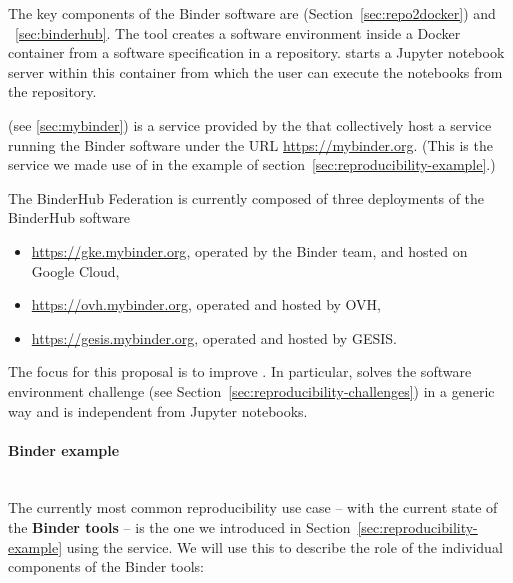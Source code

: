 
The key components of the Binder software are \repotodocker{}
(Section~\ref{sec:repo2docker}) and \binderhub{}~\ref{sec:binderhub}. The \repotodocker{} tool
creates a software environment inside a Docker container from a software
specification in a repository. \binderhub{} starts a Jupyter notebook server
within this container from which the user can execute the notebooks from the
repository.

\emph{\mybinder{}} (see \ref{sec:mybinder}) is a service provided by the  that collectively host a service running the Binder software
under the URL \url{https://mybinder.org}. (This is the service we made use of in the example
of section~\ref{sec:reproducibility-example}.)

The BinderHub Federation is currently composed of three deployments of the BinderHub software

\begin{itemize}
\item \url{https://gke.mybinder.org}, operated by the Binder team, and hosted on Google Cloud,
\item \url{https://ovh.mybinder.org}, operated and hosted by OVH,
\item \url{https://gesis.mybinder.org}, operated and hosted by GESIS.
\end{itemize}

The focus for this proposal is to improve \repotodocker{}. In particular,
\repotodocker{} solves the software environment challenge (see
Section~\ref{sec:reproducibility-challenges}) in a generic way and is independent
from Jupyter notebooks.


\paragraph{Binder example}
\label{binder-how-does-it-work}

\mbox{}\\

The currently most common reproducibility use case -- with the current state of the
\textbf{Binder tools} -- is the one we introduced in
Section~\ref{sec:reproducibility-example} using the \mybinder{} service. We will use this to
describe the role of the individual components of the Binder tools:

